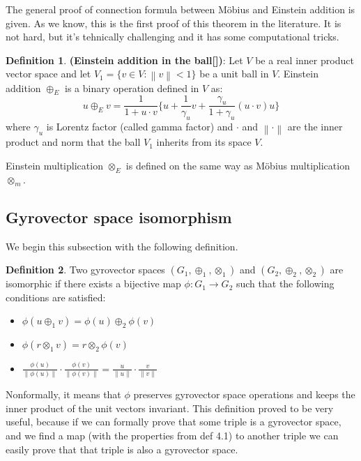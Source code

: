 \documentclass[a4paper]{article}
\theoremstyle{definition}
\newtheorem{definition}{Definition}[section]
\newcommand{\norm}[1]{\left\lVert#1\right\rVert}
\begin{document}
The general proof of connection formula between M\" obius and Einstein
addition is given. As we know, this is the first proof of this theorem
in the literature. It is not hard, but it's tehnically challenging and
it has some computational tricks.




\begin{definition}\textbf{(Einstein addition in the ball[])}: Let $V$ be a real inner product vector space and let $V_1 = \{v\in V: \norm{v}<1\}$ be a unit ball in $V$. Einstein addition $\oplus_E$ is a binary operation defined in $V$ as:
$$u \oplus_E v = \frac{1}{1+u\cdot v}\Big\{u+\frac{1}{\gamma_u}v+\frac{\gamma_u}{1+\gamma_u}(u\cdot v)u\Big\}$$ 
where $\gamma_u$ is Lorentz factor (called gamma factor) and $\cdot$ and $\norm{\cdot}$ are the inner product and norm that the ball $V_1$ inherits from its space $V$. 
\end{definition}

Einstein multiplication $\otimes_E$ is defined on the same way as M\" obius multiplication $\otimes_m$.

\subsection{Gyrovector space isomorphism}
We begin this subsection with the following definition.

\begin{definition} Two gyrovector spaces $(G_1, \oplus_1, \otimes_1)$ and $(G_2, \oplus_2, \otimes_2)$  are isomorphic if there exists a bijective map $\phi: G_1 \rightarrow G_2$ such that the following conditions are satisfied:
\begin{itemize}
    \item $\phi(u\oplus_1 v) = \phi(u)\oplus_2 \phi(v)$
    \item $\phi(r\otimes_1 v) = r\otimes_2 \phi(v)$
    \item $\frac{\phi(u)}{\parallel \phi(u) \parallel}\cdot \frac{\phi(v)}{\parallel \phi(v)\parallel} = \frac{u}{\parallel u \parallel}\cdot \frac{v}{\parallel v \parallel}$
\end{itemize}
\end{definition}
Nonformally, it means that $\phi$ preserves gyrovector space operations and keeps the inner product of the unit vectors invariant.
This definition proved to be very useful, because if we can formally prove that some triple is a gyrovector space, and we find a map (with the properties from def 4.1) to another triple we can easily prove that that triple is also a gyrovector space. 
\end{document}
